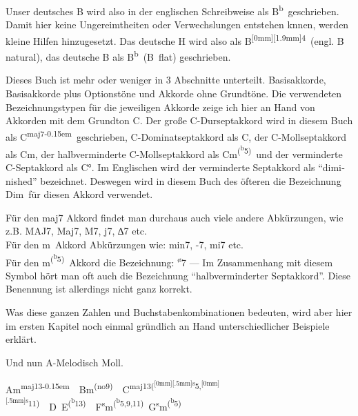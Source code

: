 \documentclass[BCOR12mm,DIV11,headings=normal]{scrbook}
\newcommand{\neuq}[1]{\foreignquote{danish}{#1}}
\newcommand{\nat}{\textsuperscript{\Notationklein \hspace{.3mm}\raisebox{0mm}[0mm][1.9mm]4}}
\newcommand{\be}{\textsuperscript{\Notation \hspace{.3mm}b}}
\newcommand{\beklein}{\textsuperscript{\Notationklein \hspace{.3mm}b}}
\newcommand{\kreuz}{\textsuperscript{\Notation \hspace{.3mm}s}}
\newcommand{\kreuzklein}{\textsuperscript{\Notationklein \hspace{.3mm}\raisebox{0mm}[0mm][.5mm]{s}}}
\newcommand{\halfdim}{\textsuperscript{\rmfamily \hspace{.3mm}ø}}
\newcommand{\sieben}{\textsuperscript{\Chordname7{\kern -0.15em}}}
\newcommand{\siebenflat}{\textsuperscript{\Chordname7({\beklein}5)}}
\newcommand{\siebenflatneunelf}{\textsuperscript{\Chordname7({\beklein}5,9,11)}}
\newcommand{\msieben}{\textsuperscript{\Chordname maj7{\kern -0.15em}}}
\newcommand{\neunbdreizehn}{\textsuperscript{\Chordname9({\beklein}13)}}
\newcommand{\dreizehn}{\textsuperscript{\Chordname13}}
\newcommand{\dreizehnnoneun}{\textsuperscript{\Chordname13(no9)}}
\newcommand{\mdreizehn}{\textsuperscript{\Chordname maj13{\kern -0.15em}}}
\newcommand{\mdreizehnsharpkelf}{\textsuperscript{\Chordname maj13({\kreuzklein}5,{\kreuzklein}11)}}
\begin{document}
Unser deutsches B wird also in der englischen Schreibweise als B\be\ geschrieben. Damit hier keine Ungereimtheiten oder Verwechslungen entstehen knnen, werden kleine Hilfen hinzugesetzt. Das deutsche H wird also als B\nat\ (engl. B natural), das deutsche B als B\be\ (B~flat) geschrieben.

Dieses Buch ist mehr oder weniger in 3 Abschnitte unterteilt.  Basisakkorde, Basisakkorde plus Optionstöne und Akkorde ohne Grundtöne. Die verwendeten Bezeichnungstypen für die jeweiligen Akkorde zeige ich hier an Hand von Akkorden mit dem Grundton C. Der große C-Durseptakkord wird in diesem Buch als C\msieben\ geschrieben, C-Dominatseptakkord als C\sieben, der C-Mollseptakkord als Cm\sieben, der halbverminderte C-Mollseptakkord als Cm\siebenflat\ und der verminderte C-Septakkord als C°\sieben. Im Englischen wird der verminderte Septakkord als \neuq{diminished} bezeichnet. Deswegen wird in diesem Buch des öfteren die Bezeichnung Dim\sieben\ für diesen Akkord verwendet.

Für den maj7 Akkord findet man durchaus auch viele andere Abkürzungen, wie z.B. MAJ7, Maj7, M7, j7, ∆7 etc.\\
Für den m\sieben\ Akkord Abkürzungen wie: min7, -7, mi7 etc.\\
Für den m\siebenflat\ Akkord die Bezeichnung: \halfdim7 --- Im Zusammenhang mit diesem Symbol hört man oft auch die Bezeichnung \neuq{halbverminderter Septakkord}. Diese Benennung ist allerdings nicht ganz korrekt.

Was diese ganzen Zahlen und Buchstabenkombinationen bedeuten, wird aber hier im ersten Kapitel noch einmal gründlich an Hand unterschiedlicher Beispiele erklärt.

\clearpage


\noindent
Und nun  A-Melodisch Moll.

\vspace{6mm}



{\Chordname
  \hspace{5mm} Am\mdreizehn\ \hfill\ Bm\dreizehnnoneun\ \hfill\ C\mdreizehnsharpkelf\ \hfill\ D\dreizehn\hfill\ E\neunbdreizehn\ \hfill\ F{\kreuz}m\siebenflatneunelf\hfill\ G{\kreuz}m\siebenflat\hfill}

\vspace{6mm}



%
%



\backmatter

%


\printindex
\end{document}
